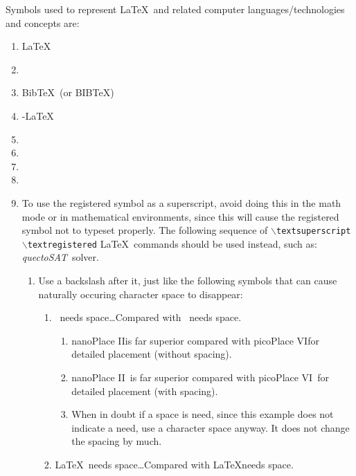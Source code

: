 Symbols used to represent \LaTeX\ and related computer languages/technologies and concepts are: \vspace{-0.3cm}
\begin{enumerate} \itemsep -4pt
\item \LaTeX
\item \LaTeXe
\item {\sc Bib}\TeX\ (or B{\scriptsize IB}\TeX)
\item \AmS-\LaTeX
\item \MP
\item \MF
\item \texttrademark
\item \textregistered
\item To use the registered symbol as a superscript, avoid doing this in the math mode or in mathematical environments, since this will cause the registered symbol not to typeset properly. The following sequence of {\tt $\backslash$textsuperscript}{\tt $\backslash$textregistered} \LaTeX\ commands should be used instead, such as: {\it quectoSAT}\textsuperscript\textregistered\ solver. \vspace{-0.3cm}
	\begin{enumerate} \itemsep -2pt
	\item Use a backslash after it, just like the following symbols that can cause naturally occuring character space to disappear: \vspace{-0.2cm}
		\begin{enumerate} \itemsep -2pt
		\item \textsuperscript\textregistered\ needs space\dots Compared with \textsuperscript\textregistered\ needs space. \vspace{-0.1cm}
			\begin{enumerate} \itemsep -1pt
			\item nanoPlace II\textsuperscript\textregistered is far superior compared with picoPlace VI\textsuperscript\textregistered for detailed placement (without spacing).
			\item nanoPlace II\textsuperscript\textregistered\ is far superior compared with picoPlace VI\textsuperscript\textregistered\ for detailed placement (with spacing).
			\item When in doubt if a space is need, since this example does not indicate a need, use a character space anyway. It does not change the spacing by much.
			\end{enumerate}
		\item \LaTeX\ needs space\dots Compared with \LaTeX needs space.

\end{enumerate}
\end{enumerate}
\end{enumerate}
